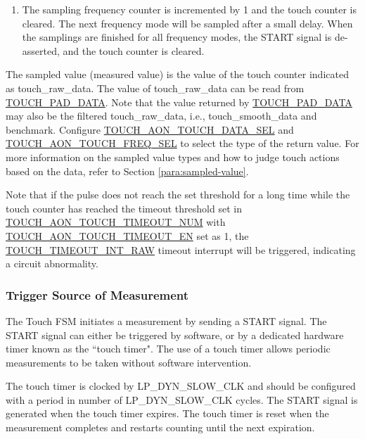 \documentclass[main\_\_EN.tex]{subfiles}
\begin{document}
\begin{itemize}
\begin{enumerate}
            \item The sampling frequency counter is incremented by 1 and the touch counter is cleared. The next frequency mode will be sampled after a small delay. When the samplings are finished for all frequency modes, the START signal is de-asserted, and the touch counter is cleared. 
        \end{enumerate}
\end{itemize}

The sampled value (measured value) is the value of the touch counter indicated as touch\_raw\_data. The value of touch\_raw\_data can be read from \hyperref[fielddesc:TOUCHPAD0DATA]{TOUCH\_PAD\_DATA}. Note that the value returned by \hyperref[fielddesc:TOUCHPAD0DATA]{TOUCH\_PAD\_DATA} may also be the filtered touch\_raw\_data, i.e., touch\_smooth\_data and benchmark. Configure \hyperref[fielddesc:TOUCHAONTOUCHDATASEL]{TOUCH\_AON\_TOUCH\_DATA\_SEL} and \hyperref[fielddesc:TOUCHAONTOUCHFREQSEL]{TOUCH\_AON\_TOUCH\_FREQ\_SEL} to select the type of the return value. For more information on the sampled value types and how to judge touch actions based on the data, refer to Section \ref{para:sampled-value}.

\begin{tiplisting}
Note that if the pulse does not reach the set threshold for a long time while the touch counter has reached the timeout threshold set in \hyperref[fielddesc:TOUCHAONTOUCHTIMEOUTNUM]{TOUCH\_AON\_TOUCH\_TIMEOUT\_NUM} with \hyperref[fielddesc:TOUCHAONTOUCHTIMEOUTEN]{TOUCH\_AON\_TOUCH\_TIMEOUT\_EN} set as 1, the \hyperref[fielddesc:TOUCHTIMEOUTINTRAW]{ TOUCH\_TIMEOUT\_INT\_RAW} timeout interrupt will be triggered, indicating a circuit abnormality.
\end{tiplisting}

\subsubsection{Trigger Source of Measurement}

The Touch FSM initiates a measurement by sending a START signal. The START signal can either be triggered by software, or by a dedicated hardware timer known as the ``touch timer". The use of a touch timer allows periodic measurements to be taken without software intervention.

The touch timer is clocked by LP\_DYN\_SLOW\_CLK and should be configured with a period in number of LP\_DYN\_SLOW\_CLK cycles. The START signal is generated when the touch timer expires. The touch timer is reset when the measurement completes and restarts counting until the next expiration.
\end{document}
